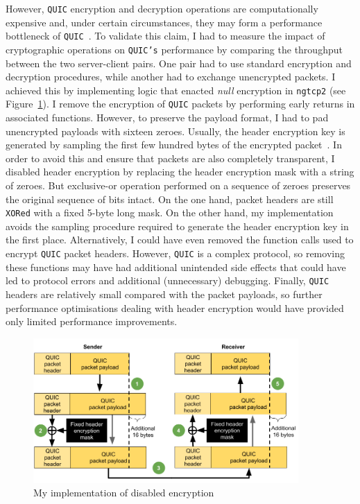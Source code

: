\documentclass[12pt,a4paper]{report}
\begin{document}
However, \texttt{QUIC} encryption and decryption operations are computationally expensive and, under certain circumstances, they may form a performance bottleneck of \texttt{QUIC}~\cite{Making_QUIC_Quicker}.
To validate this claim, I had to measure the impact of cryptographic operations on \texttt{QUIC's} performance by comparing the throughput between the two server-client pairs.
One pair had to use standard encryption and decryption procedures, while another had to exchange unencrypted packets.
I achieved this by implementing logic that enacted \textit{null} encryption in \texttt{ngtcp2} (see Figure~\ref{fig:my_implementation_of_cryptographic_procedures_of_quic}).
I remove the encryption of \texttt{QUIC} packets by performing early returns in associated functions.
However, to preserve the payload format, I had to pad unencrypted payloads with sixteen zeroes.
Usually, the header encryption key is generated by sampling the first few hundred bytes of the encrypted packet~\cite[Section 5.4.1]{ietf-quic-tls-32}. 
In order to avoid this and ensure that packets are also completely transparent, I disabled header encryption by replacing the header encryption mask with a string of zeroes.
But exclusive-or operation performed on a sequence of zeroes preserves the original sequence of bits intact.
On the one hand, packet headers are still \texttt{XORed} with a fixed 5-byte long mask.
On the other hand, my implementation avoids the sampling procedure required to generate the header encryption key in the first place.
Alternatively, I could have even removed the function calls used to encrypt \texttt{QUIC} packet headers.
However, \texttt{QUIC} is a complex protocol, so removing these functions may have had additional unintended side effects that could have led to protocol errors and additional (unnecessary) debugging.
Finally, \texttt{QUIC} headers are relatively small compared with the packet payloads, so further performance optimisations dealing with header encryption would have provided only limited performance improvements.


    \begin{figure}[ht]
    \centering
    \includegraphics[width=0.9\textwidth]{figs/my_implementation_of_cryptographic_procedures_of_quic.png}
    \caption[My implementation of disabled encryption]{My implementation of disabled encryption}
    \label{fig:my_implementation_of_cryptographic_procedures_of_quic}
    \end{figure}
\end{document}
